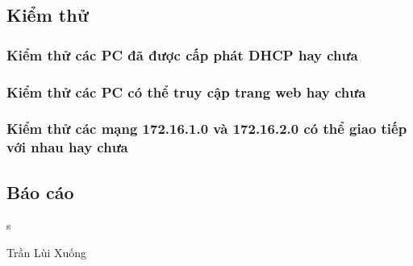 \documentclass[]{article}
\begin{document}
\subsection{Kiểm thử}
\subsubsection{Kiểm thử các PC đã được cấp phát DHCP hay chưa}
\subsubsection{Kiểm thử các PC có thể truy cập trang web hay chưa}
\subsubsection{Kiểm thử các mạng 172.16.1.0 và 172.16.2.0 có thể giao tiếp với nhau hay chưa}
\subsection{Báo cáo}
s

\begin{thebibliography}{10}
Trần Lùi Xuống
\end{thebibliography}
\end{document}
